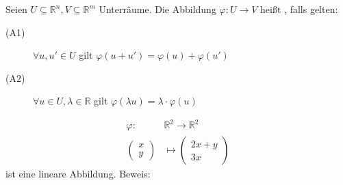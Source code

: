 \newpage
{}
Seien $U \subseteq \mathbb{R}^n, V \subseteq \mathbb{R}^m$ Unterräume. Die Abbildung $\varphi : U \rightarrow V$ heißt , falls gelten:
\begin{description}
	\item[(A1)]{$\forall u, u' \in U$ gilt $\varphi(u+u') = \varphi(u) + \varphi(u')$}
	\item[(A2)]{$\forall u \in U, \lambda \in \mathbb{R}$ gilt $\varphi(\lambda u) = \lambda \cdot \varphi(u)$}
\end{description}

\begin{align*}
	\varphi :\,\,&\mathbb{R}^2 \rightarrow \mathbb{R}^2 \\
	\begin{pmatrix}x\\y\end{pmatrix} &\mapsto \begin{pmatrix}2x+y\\3x\end{pmatrix}
\end{align*}
ist eine lineare Abbildung. Beweis:
